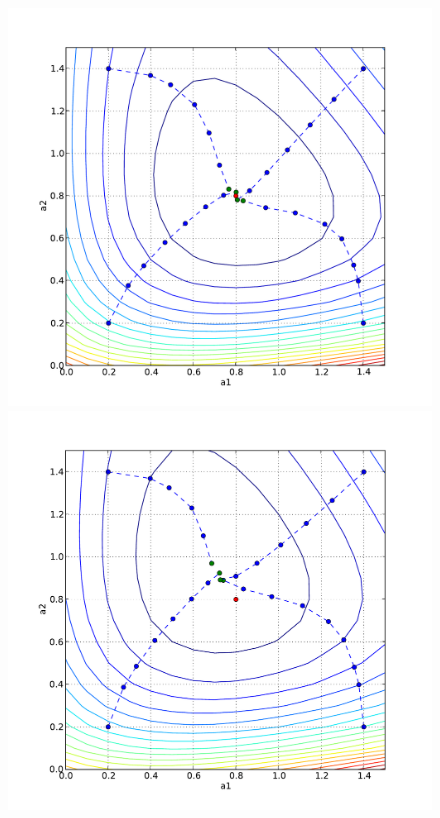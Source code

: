 \begin{figure}
\bwfig
  \centering
  \includegraphics[width=\twofigs]{chapters/schroll/pdf/a1a2scan4.pdf}
  \includegraphics[width=\twofigs]{chapters/schroll/pdf/a1a2scan4-5.pdf} \\

\end{figure}
